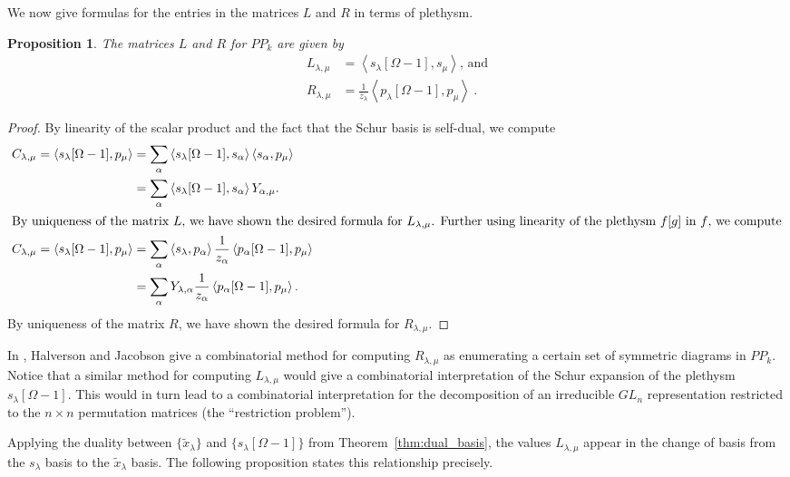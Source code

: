 \documentclass{amsart}
\newtheorem{prop}[lemma]{Proposition}
\theoremstyle{definition}
\newcommand{\PP}{P\!P}
\newcommand{\xt}{\tilde x}
\begin{document}
We now give formulas for the entries in the matrices $L$ and $R$ in terms of plethysm.

\begin{prop}\label{prop:plethystic_formula_for_factorization}
	The matrices $L$ and $R$ for $\PP_k$ are given by
	\begin{align*}
		L_{\lambda,\mu}&=\left< s_\lambda[\Omega-1], s_\mu \right>\text{, and}\\
		R_{\lambda,\mu}&=\frac{1}{z_\lambda}\left< p_\lambda[\Omega-1], p_\mu \right>~.
	\end{align*}
\end{prop}

\begin{proof}
By linearity of the scalar product and the fact that the Schur basis is self-dual, we compute
\begin{align*}
	C_{\lambda,\mu}=\left< s_\lambda[\Omega-1], p_\mu \right>&= \sum_\alpha \left< s_\lambda[\Omega-1], s_\alpha \right> \left< s_\alpha, p_\mu \right>\\
	&=\sum_\alpha \left< s_\lambda[\Omega-1], s_\alpha \right> Y_{\alpha,\mu}.\\
	\intertext{By uniqueness of the matrix $L$, we have shown the desired formula for $L_{\lambda,\mu}$.
	Further using linearity of the plethysm $f[g]$ in $f$, we compute}
	C_{\lambda,\mu}=\left< s_\lambda[\Omega-1], p_\mu \right>&=\sum_\alpha \left<s_\lambda, p_\alpha \right> \frac{1}{z_\alpha}\left< p_\alpha[\Omega-1], p_\mu \right>\\
	&=\sum_\alpha Y_{\lambda,\alpha}\frac{1}{z_\alpha}\left< p_\alpha[\Omega-1], p_\mu \right>.
\end{align*}
By uniqueness of the matrix $R$, we have shown the desired formula for $R_{\lambda,\mu}$.
\end{proof}

In \cite[Theorem 5.20]{halverson_jacobson}, Halverson and Jacobson give a combinatorial method for
computing $R_{\lambda,\mu}$ as enumerating a certain set of symmetric diagrams in $\PP_k$.
Notice that a similar method for computing $L_{\lambda,\mu}$ would  give a combinatorial
interpretation of the Schur expansion of the plethysm $s_\lambda[\Omega-1]$. This would in turn
lead to a combinatorial interpretation for the decomposition of an irreducible $GL_n$ representation
restricted to the $n\times n$ permutation matrices (the ``restriction problem'').


Applying the duality between $\{\xt_\lambda\}$ and $\{s_\lambda[\Omega-1]\}$ from Theorem~\ref{thm:dual_basis},
the values $L_{\lambda,\mu}$ appear in the change of basis
from the $s_\lambda$ basis to the $\xt_\lambda$ basis.
The following proposition states this relationship precisely.
\end{document}
